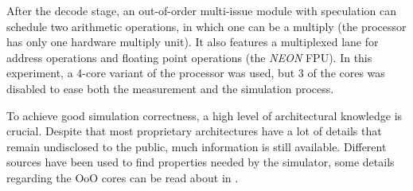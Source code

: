 After the decode stage, an out-of-order multi-issue module with speculation can
schedule two arithmetic operations, in which one can be a multiply (the
processor has only one hardware multiply unit). It also features a multiplexed
lane for address operations and floating point operations (the \emph{NEON} FPU).
In this experiment, a 4-core variant of the processor was used, but 3 of the
cores was disabled to ease both the measurement and the simulation process.

To achieve good simulation correctness, a high level of architectural knowledge
is crucial. Despite that most proprietary architectures have a lot of details
that remain undisclosed to the public, much information is still available.
Different sources have been used to find properties needed by the simulator,
some details regarding the OoO cores can be read about in
\cite{blem2013detailed}.
